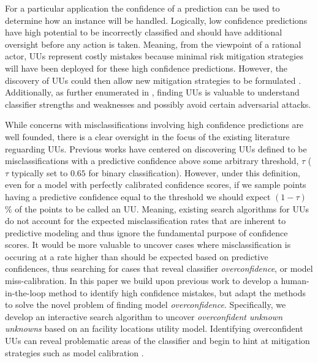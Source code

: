 \documentclass[conference]{IEEEtran}
\begin{document}
For a particular application the confidence of a prediction can be used to determine how an instance will be handled.  Logically, low confidence predictions have high potential to be incorrectly classified and should have additional oversight before any action is taken.  Meaning, from the viewpoint of a rational actor, UUs represent costly mistakes because minimal risk mitigation strategies will have been deployed for these high confidence predictions.  However, the discovery of UUs could then allow new mitigation strategies to be formulated \citep{Nushi2016a}. Additionally, as further enumerated in \citet{Bansal2018}, finding UUs is valuable to understand classifier strengths and weaknesses and possibly avoid certain adversarial attacks.

While concerns with misclassifications involving high confidence predictions are well founded, there is a clear oversight in the focus of the existing literature reguarding UUs. Previous works have centered on discovering UUs defined to be misclassifications with a predictive confidence above some arbitrary threshold, $\tau$ ($\tau$ typically set to $0.65$ for binary classification). However, under this definition, even for a model with perfectly calibrated confidence scores, if we sample points having a predictive confidence equal to the threshold we should expect $(1-\tau)$\% of the points to be called an UU. Meaning, existing search algorithms for UUs do not account for the expected misclassification rates that are inherent to predictive modeling and thus ignore the fundamental purpose of confidence scores.  It would be more valuable to uncover cases where misclassification is occuring at a rate higher than should be expected based on predictive confidences, thus searching for cases that reveal classifier \textit{overconfidence}, or model miss-calibration. In this paper we build upon previous work to develop a human-in-the-loop method to identify high confidence mistakes, but adapt the methods to solve the novel problem of finding model \textit{overconfidence}. Specifically, we develop an interactive search algorithm to uncover \textit{overconfident unknown unknowns} based on an facility locations utility model. Identifying overconfident UUs can reveal problematic areas of the classifier and begin to hint at mitigation strategies such as model calibration \citep{bella2010calibration}.  
\end{document}
